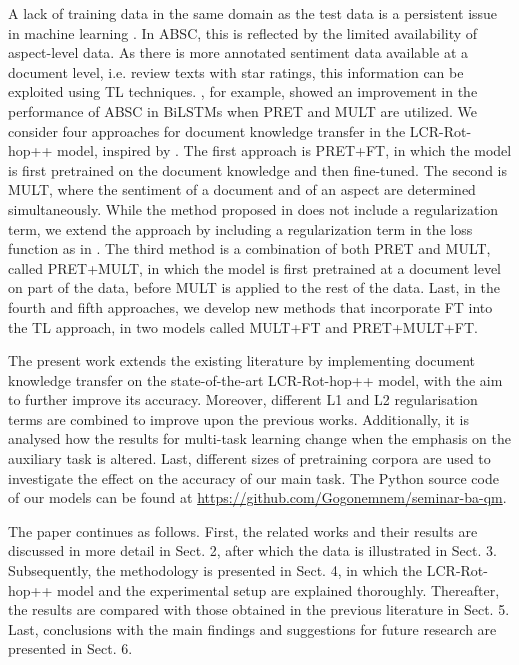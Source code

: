\documentclass[runningheads]{llncs}
\begin{document}
A lack of training data in the same domain as the test data is a persistent issue in machine learning \cite{pan2010}. In ABSC, this is reflected by the limited availability of aspect-level data. As there is more annotated sentiment data available at a document level, i.e. review texts with star ratings, this information can be exploited using TL techniques. \cite{He2018}, for example, showed an improvement in the performance of ABSC in BiLSTMs when PRET and MULT are utilized. We consider four approaches for document knowledge transfer in the LCR-Rot-hop++ model, inspired by \cite{He2018}. The first approach is PRET+FT, in which the model is first pretrained on the document knowledge and then fine-tuned. The second is MULT, where the sentiment of a document and of an aspect are determined simultaneously. While the method proposed in \cite{He2018} does not include a regularization term, we extend the approach by including a regularization term in the loss function as in \cite{Wallaart2019}. The third method is a combination of both PRET and MULT, called PRET+MULT, in which the model is first pretrained at a document level on part of the data, before MULT is applied to the rest of the data. Last, in the fourth and fifth approaches, we develop new methods that incorporate FT into the TL approach, in two models called MULT+FT and PRET+MULT+FT. 

The present work extends the existing literature by implementing document knowledge transfer on the state-of-the-art LCR-Rot-hop++ model, with the aim to further improve its accuracy. Moreover, different L1 and L2 regularisation terms are combined to improve upon the previous works. Additionally, it is analysed how the results for multi-task learning change when the emphasis on the auxiliary task is altered. Last, different sizes of pretraining corpora are used to investigate the effect on the accuracy of our main task. The Python source code of our models can be found at \url{https://github.com/Gogonemnem/seminar-ba-qm}.

The paper continues as follows. First, the related works and their results are discussed in more detail in Sect. 2, after which the data is illustrated in Sect. 3. Subsequently, the methodology is presented in Sect. 4, in which the LCR-Rot-hop++ model and the experimental setup are explained thoroughly. Thereafter, the results are compared with those obtained in the previous literature in Sect. 5. Last, conclusions with the main findings and suggestions for future research are presented in Sect. 6.
\end{document}
